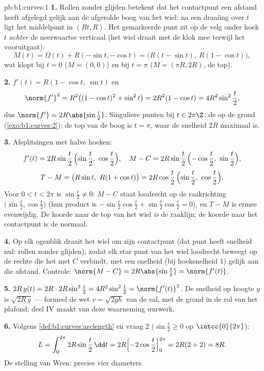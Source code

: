 \begin{solution}{pb:b1:curves:1}
\textbf{1.} Rollen zonder glijden betekent dat het contactpunt een
afstand heeft afgelegd gelijk aan de afgerolde boog van het wiel:
na een draaiing over $t$ ligt het middelpunt in $(Rt, R)$. Het
gemarkeerde punt zit op de velg onder hoek $t$ \emph{achter} de
neerwaartse verticaal (het wiel draait met de klok mee terwijl het
vooruitgaat):
\[
M(t) = \Omega(t) + R(-\sin t, -\cos t)
= \bigl(R(t - \sin t),\ R(1 - \cos t)\bigr),
\]
wat klopt bij $t = 0$ ($M = (0,0)$) en bij $t = \pi$ ($M = (\pi R,
2R)$, de top).

\textbf{2.} $f'(t) = R(1 - \cos t,\ \sin t)$ en
\[
\norm{f'}^2 = R^2\bigl((1-\cos t)^2 + \sin^2 t\bigr)
= 2R^2(1 - \cos t) = 4R^2\sin^2\frac t2 ,
\]
dus $\norm{f'} = 2R\abs{\sin\frac t2}$. Singuliere punten bij $t
\in 2\pi\Z$: de  op de grond (\cref{exo:b1:curves:2}); de
top van de boog is $t = \pi$, waar de snelheid $2R$ maximaal is.

\textbf{3.} Afsplitsingen met halve hoeken:
\[
f'(t) = 2R\sin\frac t2\,\Bigl(\sin\frac t2,\ \cos\frac t2\Bigr),
\quad
M - C = 2R\sin\frac t2\,\Bigl(-\cos\frac t2,\ \sin\frac t2\Bigr),
\]
\[
T - M = \bigl(R\sin t,\ R(1 + \cos t)\bigr)
= 2R\cos\frac t2\,\Bigl(\sin\frac t2,\ \cos\frac t2\Bigr).
\]
Voor $0 < t < 2\pi$ is $\sin\frac t2 \neq 0$: $M - C$ staat
loodrecht op de raakrichting $\bigl(\sin\frac t2, \cos\frac
t2\bigr)$ (hun product is $-\sin\frac t2\cos\frac t2 + \sin\frac
t2\cos\frac t2 = 0$), en $T - M$ is ermee evenwijdig. De koorde
naar de top van het wiel \emph{is} de raaklijn; de koorde naar het
contactpunt is de normaal.

\textbf{4.} Op elk ogenblik draait het wiel om zijn contactpunt
(dat punt heeft snelheid nul: rollen zonder glijden), zodat elk
star punt van het wiel loodrecht beweegt op de rechte die het met
$C$ verbindt, met een snelheid (bij hoeksnelheid $1$) gelijk aan
die afstand. Controle: $\norm{M - C} = 2R\abs{\sin\frac t2} =
\norm{f'(t)}$.

\textbf{5.} $2R\,y(t) = 2R\cdot 2R\sin^2\frac t2 =
4R^2\sin^2\frac t2 = \norm{f'(t)}^2$. De snelheid op hoogte $y$ is
$\sqrt{2R\,y}$ --- formeel de wet $v = \sqrt{2gh}$ van de 
val, met de grond in de rol van het plafond; deel IV maakt van deze
waarneming uurwerk.

\textbf{6.} Volgens \cref{def:b1:curves:arclength} en vraag 2
($\sin\frac t2 \geq 0$ op $\intcc{0}{2\pi}$):
\[
L = \int_0^{2\pi} 2R\sin\frac t2\,\dd t
= 2R\Bigl[-2\cos\frac t2\Bigr]_0^{2\pi} = 2R(2 + 2) = 8R .
\]
De stelling van Wren: precies vier diameters.


\end{solution}
